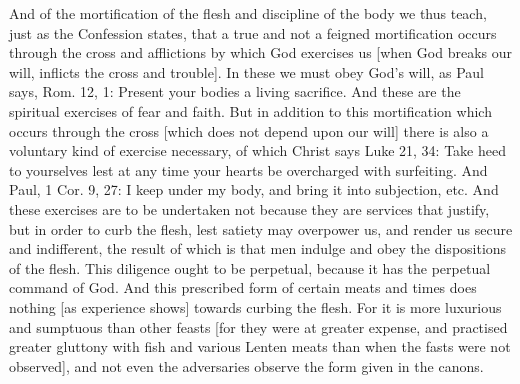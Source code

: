 And of the mortification of the flesh and discipline of the body we
thus teach, just as the Confession states, that a true and not a
feigned mortification occurs through the cross and afflictions by
which God exercises us [when God breaks our will, inflicts the cross
and trouble].  In these we must obey God's will, as Paul says, Rom.
12, 1: Present your bodies a living sacrifice.  And these are the
spiritual exercises of fear and faith.  But in addition to this
mortification which occurs through the cross [which does not depend
upon our will] there is also a voluntary kind of exercise necessary,
of which Christ says Luke 21, 34: Take heed to yourselves lest at any
time your hearts be overcharged with surfeiting.  And Paul, 1 Cor. 9,
27: I keep under my body, and bring it into subjection, etc. And
these exercises are to be undertaken not because they are services
that justify, but in order to curb the flesh, lest satiety may
overpower us, and render us secure and indifferent, the result of
which is that men indulge and obey the dispositions of the flesh.
This diligence ought to be perpetual, because it has the perpetual
command of God.  And this prescribed form of certain meats and times
does nothing [as experience shows] towards curbing the flesh.  For it
is more luxurious and sumptuous than other feasts [for they were at
greater expense, and practised greater gluttony with fish and various
Lenten meats than when the fasts were not observed], and not even the
adversaries observe the form given in the canons.

